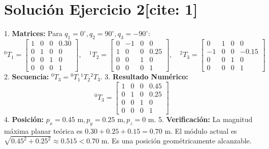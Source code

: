 \documentclass[11pt, a4paper]{article}
\begin{document}
\section*{Solución Ejercicio 2[cite: 1]}
1. \textbf{Matrices:} Para $q_1=0^\circ, q_2=90^\circ, q_3=-90^\circ$:
\begin{equation*}
    {}^{0}T_1 = \begin{bmatrix} 1&0&0&0.30 \\ 0&1&0&0 \\ 0&0&1&0 \\ 0&0&0&1 \end{bmatrix}, \quad
    {}^{1}T_2 = \begin{bmatrix} 0&-1&0&0 \\ 1&0&0&0.25 \\ 0&0&1&0 \\ 0&0&0&1 \end{bmatrix}, \quad
    {}^{2}T_3 = \begin{bmatrix} 0&1&0&0 \\ -1&0&0&-0.15 \\ 0&0&1&0 \\ 0&0&0&1 \end{bmatrix}
\end{equation*}
2. \textbf{Secuencia:} ${}^{0}T_3 = {}^{0}T_1 {}^{1}T_2 {}^{2}T_3$.
3. \textbf{Resultado Numérico:} 
\begin{equation*}
    {}^{0}T_3 = \begin{bmatrix} 1&0&0&0.45 \\ 0&1&0&0.25 \\ 0&0&1&0 \\ 0&0&0&1 \end{bmatrix}
\end{equation*}
4. \textbf{Posición:} $p_x = 0.45\text{ m}, p_y = 0.25\text{ m}, p_z = 0\text{ m}$.
5. \textbf{Verificación:} La magnitud máxima planar teórica es $0.30+0.25+0.15 = 0.70\text{ m}$. El módulo actual es $\sqrt{0.45^2 + 0.25^2} \approx 0.515 < 0.70\text{ m}$. Es una posición geométricamente alcanzable.
\end{document}
